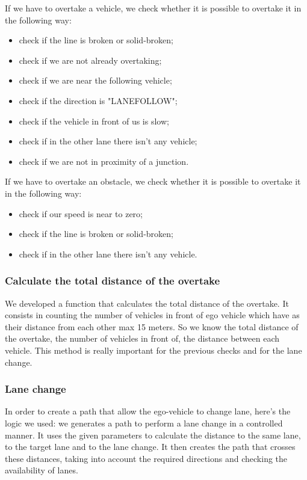 \documentclass{article}
\begin{document}
If we have to overtake a vehicle, we check whether it is possible to overtake it in the following way:
\begin{itemize}
    \item check if the line is broken or solid-broken;
    \item check if we are not already overtaking;
    \item check if we are near the following vehicle;
    \item check if the direction is "LANEFOLLOW";
    \item check if the vehicle in front of us is slow;
    \item check if in the other lane there isn't any vehicle;
    \item check if we are not in proximity of a junction.
\end{itemize}

If we have to overtake an obstacle, we check whether it is possible to overtake it in the following way:
\begin{itemize}
    \item check if our speed is near to zero;
    \item check if the line is broken or solid-broken;
    \item check if in the other lane there isn't any vehicle.
\end{itemize}

\subsubsection*{Calculate the total distance of the overtake}
We developed a function that calculates the total distance of the overtake.
It consists in counting the number of vehicles in front of ego vehicle which have as their distance from each other max 15 meters.
So we know the total distance of the overtake, the number of vehicles in front of, the distance between each vehicle.
This method is really important for the previous checks and for the lane change.

\subsubsection*{Lane change}
In order to create a path that allow the ego-vehicle to change lane, here's the logic we used:
we generates a path to perform a lane change in a controlled manner. It uses the given parameters to
calculate the distance to the same lane, to the target lane and to the lane change. It then creates
the path that crosses these distances, taking into account the required directions and checking the
availability of lanes.
\end{document}
